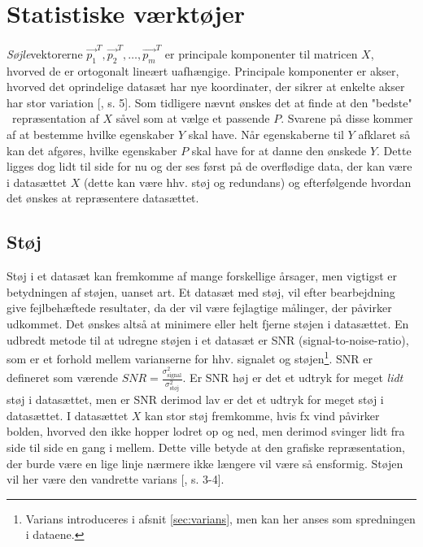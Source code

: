 \section{Statistiske værktøjer} \label{sec:statistiske tools}
\emph{Søjle}vektorerne ${\vec{p_{1}}}^{T},{\vec{p_{2}}}^{T},\ldots,{\vec{p_{m}}}^{T}$ er principale komponenter til matricen $X$, hvorved de er ortogonalt lineært uafhængige. Principale komponenter er akser, hvorved det oprindelige datasæt har nye koordinater, der sikrer at enkelte akser har stor variation [\citet{principal_component}, s. 5]. Som tidligere nævnt ønskes det at finde at den "bedste" \ repræsentation af $X$ såvel som at vælge et passende $P$. Svarene på disse kommer af at bestemme hvilke egenskaber $Y$ skal have. Når egenskaberne til $Y$ afklaret så kan det afgøres, hvilke egenskaber $P$ skal have for at danne den ønskede $Y$. Dette ligges dog lidt til side for nu og der ses først på de overflødige data, der kan være i datasættet $X$ (dette kan være hhv. støj og redundans) og efterfølgende hvordan det ønskes at repræsentere datasættet.

\subsection{Støj} \label{sec:stoj}
Støj i et datasæt kan fremkomme af mange forskellige årsager, men vigtigst er betydningen af støjen, uanset art. Et datasæt med støj, vil efter bearbejdning give fejlbehæftede resultater, da der vil være fejlagtige målinger, der påvirker udkommet. Det ønskes altså at minimere eller helt fjerne støjen i datasættet. En udbredt metode til at udregne støjen i et datasæt er SNR (signal-to-noise-ratio), som er et forhold mellem varianserne for hhv. signalet og støjen\footnote{Varians introduceres i afsnit \ref{sec:varians}, men kan her anses som spredningen i dataene.}. SNR er defineret som værende $SNR = \frac{\sigma^2_{\text{signal}}}{\sigma^{2}_{\text{støj}}}$. Er SNR høj er det et udtryk for meget \emph{lidt} støj i datasættet, men er SNR derimod lav er det et udtryk for meget støj i datasættet. I datasættet $X$ kan stor støj fremkomme, hvis fx vind påvirker bolden, hvorved den ikke hopper lodret op og ned, men derimod svinger lidt fra side til side en gang i mellem. Dette ville betyde at den grafiske repræsentation, der burde være en lige linje nærmere ikke længere vil være så ensformig. Støjen vil her være den vandrette varians [\citet{PCA_slens}, s. 3-4].

